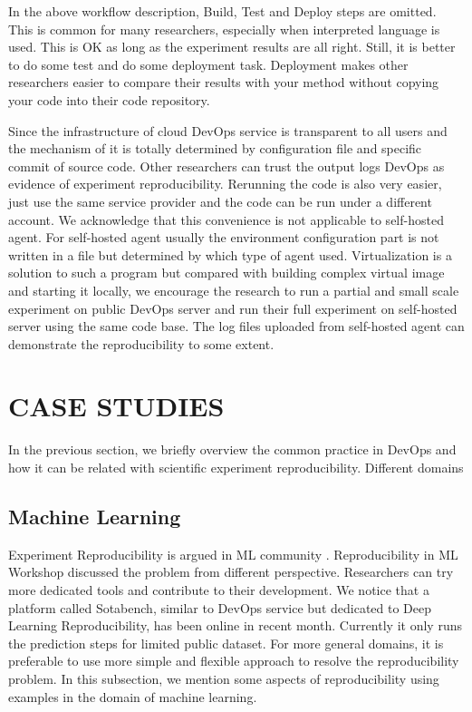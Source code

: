 \documentclass{IEEEcsmag}
\begin{document}
In the above workflow description, Build, Test and Deploy steps are omitted. This is common for many researchers, especially when interpreted language is used. This is OK as long as the experiment results are all right. Still, it is better to do some test and do some deployment task. Deployment makes other researchers easier to compare their results with your method without copying your code into their code repository.

Since the infrastructure of cloud DevOps service is transparent to all users and the mechanism of it is totally determined by configuration file and specific commit of source code. Other researchers can trust the output logs DevOps as evidence of experiment reproducibility. Rerunning the code is also very easier, just use the same service provider and the code can be run under a different account. We acknowledge that this convenience is not applicable to self-hosted agent. For self-hosted agent usually the environment configuration part is not written in a file but determined by which type of agent used. Virtualization is a solution to such a program but compared with building complex virtual image and starting it locally, we encourage the research to run a partial and small scale experiment on public DevOps server and run their full experiment on self-hosted server using the same code base. The log files uploaded from self-hosted agent can demonstrate the reproducibility to some extent.

\section{CASE STUDIES}
In the previous section, we briefly overview the common practice in DevOps and how it can be related with scientific experiment reproducibility. Different domains 

\subsection{Machine Learning}
Experiment Reproducibility is argued in ML community \cite{kegl2018ramp}. Reproducibility in ML Workshop discussed the problem from different perspective. Researchers can try more dedicated tools and contribute to their development. We notice that a platform called \textsf{Sotabench}, similar to DevOps service but dedicated to Deep Learning Reproducibility, has been online in recent month. Currently it only runs the prediction steps for limited public dataset. For more general domains, it is preferable to use more simple and flexible approach to resolve the reproducibility problem. In this subsection, we mention some aspects of reproducibility using examples in the domain of machine learning. 
\end{document}
